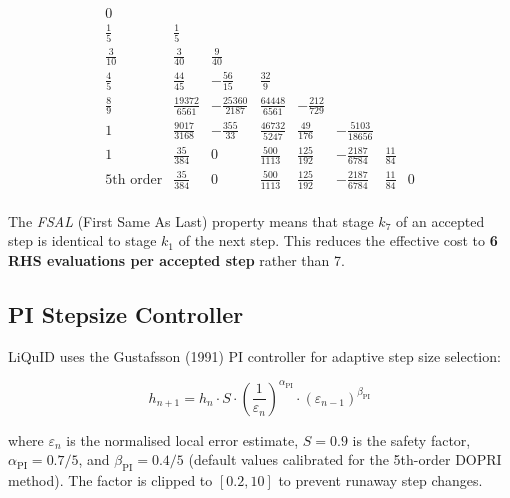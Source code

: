 \documentclass[11pt,a4paper,twoside]{book}
\theoremstyle{definition}
\theoremstyle{remark}
\begin{document}
\begin{equation}
\renewcommand{\arraystretch}{1.3}
\begin{array}{c|ccccccc}
0           &        &           &           &           &           &       &   \\
\tfrac{1}{5}&\tfrac{1}{5} &      &           &           &           &       &   \\
\tfrac{3}{10}&\tfrac{3}{40}&\tfrac{9}{40}& &           &           &       &   \\
\tfrac{4}{5}&\tfrac{44}{45}&-\tfrac{56}{15}&\tfrac{32}{9}& &      &       &   \\
\tfrac{8}{9}&\tfrac{19372}{6561}&-\tfrac{25360}{2187}&\tfrac{64448}{6561}&-\tfrac{212}{729}& & & \\
1           &\tfrac{9017}{3168}&-\tfrac{355}{33}&\tfrac{46732}{5247}&\tfrac{49}{176}&-\tfrac{5103}{18656}& & \\
1           &\tfrac{35}{384}&0&\tfrac{500}{1113}&\tfrac{125}{192}&-\tfrac{2187}{6784}&\tfrac{11}{84}& \\
\hline
\text{5th order} & \tfrac{35}{384} & 0 & \tfrac{500}{1113} & \tfrac{125}{192} & -\tfrac{2187}{6784} & \tfrac{11}{84} & 0 \\
\end{array}
\end{equation}

The \emph{FSAL} (First Same As Last) property means that stage $k_7$ of
an accepted step is identical to stage $k_1$ of the next step.
This reduces the effective cost to \textbf{6 RHS evaluations per accepted
step} rather than 7.

\subsection{PI Stepsize Controller}
\label{subsec:pi-controller}

LiQuID uses the Gustafsson (1991) PI controller for adaptive step
size selection:

\begin{equation}
  h_{n+1} = h_n \cdot S \cdot
    \left(\frac{1}{\varepsilon_n}\right)^{\alpha_{\mathrm{PI}}}
    \cdot
    \left(\varepsilon_{n-1}\right)^{\beta_{\mathrm{PI}}}
  \label{eq:pi-controller}
\end{equation}

where $\varepsilon_n$ is the normalised local error estimate,
$S = 0.9$ is the safety factor, $\alpha_{\mathrm{PI}} = 0.7/5$,
and $\beta_{\mathrm{PI}} = 0.4/5$ (default values calibrated for
the 5th-order DOPRI method). The factor is clipped to $[0.2, 10]$
to prevent runaway step changes.
\end{document}
